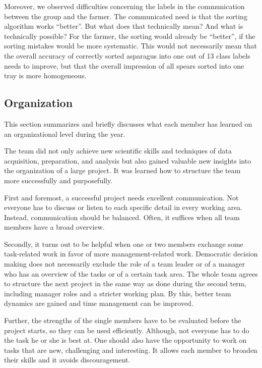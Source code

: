 Moreover, we observed difficulties concerning the labels in the communication between the group and the farmer. The communicated need is that the sorting algorithm works \enquote{better}. But what does that technically mean? And what is technically possible? For the farmer, the sorting would already be \enquote{better}, if the sorting mistakes would be more systematic. This would not necessarily mean that the overall accuracy of correctly sorted asparagus into one out of 13 class labels needs to improve, but that the overall impression of all spears sorted into one tray is more homogeneous. 


\subsection{Organization}
\label{sec:DiscussionOrganization}

This section summarizes and briefly discusses what each member has learned on an organizational level during the year.

The team did not only achieve new scientific skills and techniques of data acquisition, preparation, and analysis but also gained valuable new insights into the organization of a large project. It was learned how to structure the team more successfully and purposefully.

\bigskip
First and foremost, a successful project needs excellent communication. Not everyone has to discuss or listen to each specific detail in every working area. Instead, communication should be balanced. Often, it suffices when all team members have a broad overview.

Secondly, it turns out to be helpful when one or two members exchange some task-related work in favor of more management-related work. Democratic decision making does not necessarily exclude the role of a team leader or of a manager who has an overview of the tasks or of a certain task area. The whole team agrees to structure the next project in the same way as done during the second term, including manager roles and a stricter working plan. By this, better team dynamics are gained and time management can be improved.

Further, the strengths of the single members have to be evaluated before the project starts, so they can be used efficiently. Although, not everyone has to do the task he or she is best at. One should also have the opportunity to work on tasks that are new, challenging and interesting. It allows each member to broaden their skills and it avoids discouragement. 

